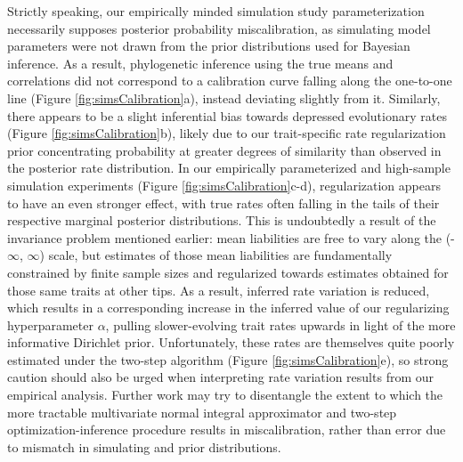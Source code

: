 Strictly speaking, our empirically minded simulation study parameterization necessarily supposes posterior probability miscalibration, as simulating model parameters were not drawn from the prior distributions used for Bayesian inference. As a result, phylogenetic inference using the true means and correlations did not correspond to a calibration curve falling along the one-to-one line (Figure \ref{fig:simsCalibration}a), instead deviating slightly from it.   Similarly, there appears to be a slight inferential bias towards depressed evolutionary rates (Figure \ref{fig:simsCalibration}b), likely due to our trait-specific rate regularization prior concentrating probability at greater degrees of similarity than observed in the posterior rate distribution. In our empirically parameterized and high-sample simulation experiments (Figure \ref{fig:simsCalibration}c-d), regularization appears to have an even stronger effect, with true rates often falling in the tails of their respective marginal posterior distributions. This is undoubtedly a result of the invariance problem mentioned earlier: mean liabilities are free to vary along the (-$\infty$, $\infty$) scale, but estimates of those mean liabilities are fundamentally constrained by finite sample sizes and regularized towards estimates obtained for those same traits at other tips. As a result, inferred rate variation is reduced, which results in a corresponding increase in the inferred value of our regularizing hyperparameter $\alpha$, pulling slower-evolving trait rates upwards in light of the more informative Dirichlet prior. Unfortunately, these rates are themselves quite poorly estimated under the two-step algorithm (Figure \ref{fig:simsCalibration}e), so strong caution should also be urged when interpreting rate variation results from our empirical analysis. Further work may try to disentangle the extent to which the more tractable multivariate normal integral approximator and two-step optimization-inference procedure results in miscalibration, rather than error due to mismatch in simulating and prior distributions. 

